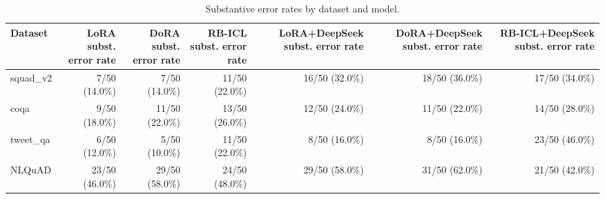 \begin{table}[htbp]
\centering
\small
\begin{tabular}{lrrrrrr}
\toprule
Dataset & LoRA subst. error rate & DoRA subst. error rate & RB-ICL subst. error rate & LoRA+DeepSeek subst. error rate & DoRA+DeepSeek subst. error rate & RB-ICL+DeepSeek subst. error rate \\
\midrule
squad\_v2 & 7/50 (14.0\%) & 7/50 (14.0\%) & 11/50 (22.0\%) & 16/50 (32.0\%) & 18/50 (36.0\%) & 17/50 (34.0\%) \\
coqa & 9/50 (18.0\%) & 11/50 (22.0\%) & 13/50 (26.0\%) & 12/50 (24.0\%) & 11/50 (22.0\%) & 14/50 (28.0\%) \\
tweet\_qa & 6/50 (12.0\%) & 5/50 (10.0\%) & 11/50 (22.0\%) & 8/50 (16.0\%) & 8/50 (16.0\%) & 23/50 (46.0\%) \\
NLQuAD & 23/50 (46.0\%) & 29/50 (58.0\%) & 24/50 (48.0\%) & 29/50 (58.0\%) & 31/50 (62.0\%) & 21/50 (42.0\%) \\
\bottomrule
\end{tabular}
\caption{Substantive error rates by dataset and model.}
\label{tab:dataset_model_error_profile}
\end{table}
